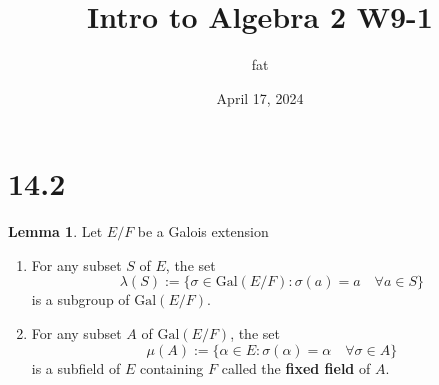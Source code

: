 \documentclass{article}
\title{Intro to Algebra 2 W9-1}
\author{fat}
\date{April 17, 2024}
\theoremstyle{definition}
\newtheorem{lem}{Lemma}
\begin{document}
\maketitle
\thispagestyle{fancy}
\renewcommand{\footrulewidth}{0.4pt}
\cfoot{\thepage}
\renewcommand{\headrulewidth}{0.4pt}

\section*{14.2}

\begin{lem}
	Let $E/F$ be a Galois extension
	\begin{enumerate}
		\item[(1)] For any subset $S$ of $E$, the set 
			\[
				\lambda(S) := \{\sigma \in \text{Gal}(E/F): \sigma(a) = a \quad \forall a \in S\}
			\]
			is a subgroup of $\text{Gal}(E/F)$.
			
		\item[(2)] For any subset $A$ of $\text{Gal}(E/F)$, the set
			\[
				\mu(A) := \{\alpha \in E: \sigma(\alpha) = \alpha \quad \forall \sigma \in A\}
			\]
			is a subfield of $E$ containing $F$ called the \textbf{fixed field} of $A$.
	\end{enumerate}
\end{lem}
\end{document}
